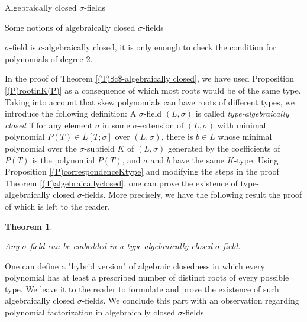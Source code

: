 \documentclass[11pt,a4paper]{article}
\theoremstyle{theorem}
\newtheorem{theorem}{Theorem}[section]
\numberwithin{equation}{section}
\newcommand{\s}{\sigma}
\begin{document}
\begin{section}{Algebraically closed $\s$-fields}
\begin{subsection}{Some notions of algebraically closed $\s$-fields}
	
	$\s$-field is $c$-algebraically closed, it is only enough to check the condition for polynomials of degree 2. 
	
	
	In the proof of Theorem \ref{(T)$c$-algebraically closed}, we have used Proposition \ref{(P)rootinK(P)} as a consequence of which most roots would be of the same type. Taking into account that skew polynomials can have roots of different types, we introduce the following definition: A $\s$-field $(L,\sigma)$ is called \textit{type-algebraically closed} if for any element $a$ in some $\s$-extension of $(L,\sigma)$ with minimal polynomial $P(T)\in L[T;\s]$ over $(L,\sigma)$, there is $b\in L$ whose minimal polynomial over the $\s$-subfield $K$ of $(L,\sigma)$  generated by the coefficients of $P(T)$ is the polynomial $P(T)$, and $a$ and $b$ have the same $K$-type.   Using Proposition \ref{(P)correspondenceKtype} and modifying the steps in the proof Theorem \ref{(T)algebraicallyclosed}, one can prove the existence of type-algebraically closed $\s$-fields. More precisely, we have the following result the proof of which is left to the reader.
	
	\begin{theorem}\label{(T)type-algebraicallyclosed}
		
		Any $\s$-field can be embedded in a type-algebraically closed $\s$-field. 
		
	\end{theorem}

	One can define a "hybrid version"  of algebraic closedness in which every polynomial has at least a prescribed number of distinct roots of every possible type. We leave it to the reader to formulate and prove the existence of such algebraically closed $\s$-fields. We conclude this  part with an observation regarding polynomial factorization in algebraically closed $\s$-fields.
	

\end{subsection}
\end{section}
\end{document}
